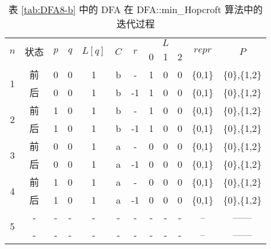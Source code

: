 \begin{table}[!htbp]
    \caption{表 \ref{tab:DFA8-b}  中的 DFA 在 DFA::min\_Hopcroft 算法中的迭代过程}
    \label{tab:hopcroftAna}
    \centering
    \footnotesize%
    \setlength{\tabcolsep}{8pt}%
    \renewcommand{\arraystretch}{1.2}%
    \begin{tabular}{ccccccc|ccc|cc} 
        \toprule%
        \multirow{2}{*}{$n$} & \multirow{2}{*}{状态} & \multirow{2}{*}{$p$} & \multirow{2}{*}{$q$} & \multirow{2}{*}{$L[q]$} & \multirow{2}{*}{$C$} & \multirow{2}{*}{$r$} & \multicolumn{3}{c|}{$L$} & \multirow{2}{*}{$repr$} & \multirow{2}{*}{$P$}  \\
        \cline{8-10}             &                   &                     &                    &                       &                   &    & 0 & 1 &2 & & \\
        \midrule%
        \multirow{2}{*}{1} & 前 & 0 & 0 & 1 & b & -  & 1 & 0 & 0 & \{0,1\} & \{0\},\{1,2\} \\
                           & 后 & 0 & 0 & 1 & b & -1 & 1 & 0 & 0 & \{0,1\} & \{0\},\{1,2\} \\
        \midrule%
        \multirow{2}{*}{2} & 前 & 1 & 0 & 1 & b & -  & 1 & 0 & 0 & \{0,1\} & \{0\},\{1,2\} \\
                           & 后 & 1 & 0 & 1 & b & -1 & 1 & 0 & 0 & \{0,1\} & \{0\},\{1,2\} \\
        \midrule%
        \multirow{2}{*}{3} & 前 & 0 & 0 & 1 & a & -  & 0 & 0 & 0 & \{0,1\} & \{0\},\{1,2\} \\
                           & 后 & 0 & 0 & 1 & a & -1 & 0 & 0 & 0 & \{0,1\} & \{0\},\{1,2\} \\
        \midrule%
        \multirow{2}{*}{4} & 前 & 1 & 0 & 1 & a & -  & 0 & 0 & 0 & \{0,1\} & \{0\},\{1,2\} \\
                           & 后 & 1 & 0 & 1 & a & -1 & 0 & 0 & 0 & \{0,1\} & \{0\},\{1,2\} \\
        \midrule%
        \multirow{2}{*}{5} & - & - & - & - & - & -  & - & - & - & -- & ------ \\
                           & - & - & - & - & - & -  & - & - & - & -- & ------ \\
        \bottomrule%
    \end{tabular}
\end{table}


